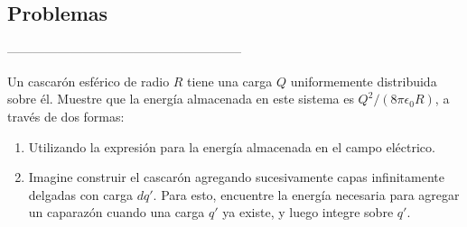 \subsection{Problemas}
--------------------------------------------------------

\np
Un cascarón esférico de radio $R$ tiene una carga $Q$ uniformemente distribuida sobre él. Muestre que la energía almacenada en este sistema es $Q^2/(8\pi\epsilon_0R)$, a través de dos formas:

\begin{enumerate}[label=\alph*)]
    \item Utilizando la expresión para la energía almacenada en el campo eléctrico.
    \item Imagine construir el cascarón agregando sucesivamente capas infinitamente delgadas con carga $dq'$. Para esto, encuentre la energía necesaria para agregar un caparazón cuando una carga $q'$ ya existe, y luego integre sobre $q'$.
\end{enumerate}



\newpage